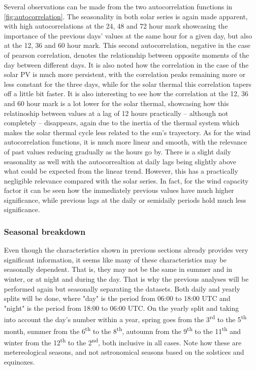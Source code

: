 Several observations can be made from the two autocorrelation functions in \autoref{fig:autocorrelation}. The seasonality in both solar series is again made apparent, with high autocorrelations at the 24, 48 and 72 hour mark showcasing the importance of the previous days' values at the same hour for a given day, but also at the 12, 36 and 60 hour mark. This second autocorrelation, negative in the case of pearson correlation, denotes the relationship between opposite moments of the day between different days. It is also noted how the correlation in the case of the solar PV is much more persistent, with the correlation peaks remaining more or less constant for the three days, while for the solar thermal this correlation tapers off a little bit faster. It is also interesting to see how the correlation at the 12, 36 and 60 hour mark is a lot lower for the solar thermal, showcasing how this relatinoship between values at a lag of 12 hours practically -- although not completely -- disappears, again due to the inertia of the thermal system which makes the solar thermal cycle less related to the sun's trayectory. As for the wind autocorrelation functions, it is much more linear and smooth, with the relevance of past values reducing gradually as the hours go by. There is a slight daily seasonality as well with the autocorrealtion at daily lags being slightly above what could be expected from the linear trend. However, this has a practically negligible relevance compared with the solar series. In fact, for the wind capacity factor it can be seen how the immediately previous values have much higher significance, while previous lags at the daily or semidaily periods hold much less significance. 

\subsubsection{Seasonal breakdown}
Even though the characteristics shown in previous sections already provides very significant information, it seems like many of these characteristics may be seasonally dependent. That is, they may not be the same in summer and in winter, or at night and during the day. That is why the previous analyses will be performed again but seasonally separating the datasets. Both daily and yearly splits will be done, where "day" is the period from 06:00 to 18:00 UTC and "night" is the period from 18:00 to 06:00 UTC. On the yearly split and taking into account the day's number within a year, spring goes from the 3\textsuperscript{rd} to the 5\textsuperscript{th} month, summer from the 6\textsuperscript{th} to the 8\textsuperscript{th}, autoumn from the 9\textsuperscript{th} to the 11\textsuperscript{th} and winter from the 12\textsuperscript{th} to the 2\textsuperscript{nd}, both inclusive in all cases. Note how these are metereological seasons, and not astronomical seasons based on the solstices and equinoxes. 

